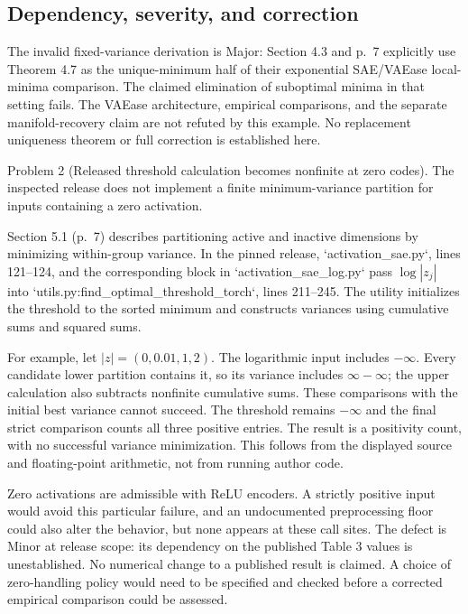 \documentclass[10pt]{article}
\begin{document}
\subsection*{Dependency, severity, and correction}
The invalid fixed-variance derivation is Major: Section 4.3 and p. 7 explicitly use Theorem 4.7 as the unique-minimum half of their exponential SAE/VAEase local-minima comparison. The claimed elimination of suboptimal minima in that setting fails. The VAEase architecture, empirical comparisons, and the separate manifold-recovery claim are not refuted by this example. No replacement uniqueness theorem or full correction is established here.\par
Problem 2 (Released threshold calculation becomes nonfinite at zero codes).  The inspected release does not implement a finite minimum-variance partition for inputs containing a zero activation.\par
Section 5.1 (p. 7) describes partitioning active and inactive dimensions by minimizing within-group variance. In the pinned release, `activation\_sae.py`, lines 121–124, and the corresponding block in `activation\_sae\_log.py` pass \(\log |z_j|\) into `utils.py:find\_optimal\_threshold\_torch`, lines 211–245. The utility initializes the threshold to the sorted minimum and constructs variances using cumulative sums and squared sums.\par
For example, let \(|z|=(0,0.01,1,2)\). The logarithmic input includes \(-\infty\). Every candidate lower partition contains it, so its variance includes \(\infty-\infty\); the upper calculation also subtracts nonfinite cumulative sums. These comparisons with the initial best variance cannot succeed. The threshold remains \(-\infty\) and the final strict comparison counts all three positive entries. The result is a positivity count, with no successful variance minimization. This follows from the displayed source and floating-point arithmetic, not from running author code.\par
Zero activations are admissible with ReLU encoders. A strictly positive input would avoid this particular failure, and an undocumented preprocessing floor could also alter the behavior, but none appears at these call sites. The defect is Minor at release scope: its dependency on the published Table 3 values is unestablished. No numerical change to a published result is claimed. A choice of zero-handling policy would need to be specified and checked before a corrected empirical comparison could be assessed.\par
\end{document}

